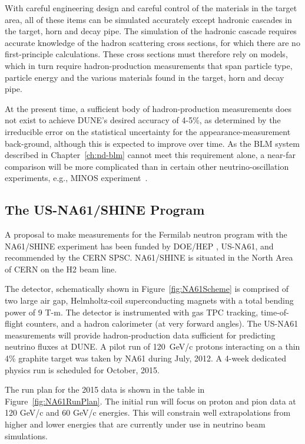 With careful engineering design and careful control of the materials in the target
area, all of these items can be simulated accurately except hadronic cascades in
the target, horn and decay pipe. The simulation of the hadronic cascade requires
accurate knowledge of the hadron scattering cross sections, for which there are no
first-principle calculations. These cross sections must therefore rely on models, which
in turn require hadron-production measurements that span particle type, particle
energy and the various materials found in the target, horn and decay pipe.

At the present time, a sufficient body of hadron-production measurements does
not exist to achieve DUNE's desired accuracy of 4-5\%, as determined by the irreducible error on the statistical uncertainty for the appearance-measurement back-ground, although this is expected to improve over time. As the BLM system described in Chapter~\ref{ch:nd-blm} cannot meet this requirement alone, a near-far comparison
will be more complicated than in certain other neutrino-oscillation experiments, e.g.,
MINOS experiment~\cite{gnumi-validation}.


\subsection{The US-NA61/SHINE Program}
\label{sec:detectors-nd-blm-external-usna61}

A proposal to make measurements for the Fermilab neutron program with the NA61/SHINE experiment has been funded by DOE/HEP \cite{ref:NA61Proposal,ref:NA61Addendum} , US-NA61, and recommended by the CERN SPSC. NA61/SHINE is situated in the North Area of CERN on the H2 beam line. 

The detector, schematically shown in Figure~\ref{fig:NA61Scheme} is comprised of two large air gap, Helmholtz-coil superconducting magnets with a total bending power of 9 T-m. The detector is instrumented with gas TPC tracking, time-of-flight counters, and a hadron calorimeter (at very forward angles). The US-NA61 measurements will provide hadron-production data sufficient for predicting neutrino fluxes at DUNE. A pilot run of 120~GeV/c protons interacting on a thin 4\% graphite target was taken by NA61 during July, 2012. A 4-week dedicated physics run is scheduled for October, 2015.

The run plan for the 2015 data is shown in the table in Figure~\ref{fig:NA61RunPlan}. The initial run will focus on proton and pion data at 120 GeV/c and 60 GeV/c energies. This will constrain well extrapolations from higher and lower energies that are currently under use in neutrino beam simulations.

